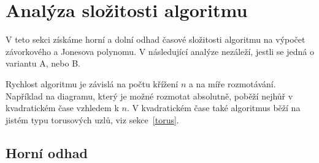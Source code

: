 \section{Analýza složitosti algoritmu}  \label{analyza}
V teto sekci získáme horní a dolní odhad časové složitosti algoritmu na výpočet závorkového a Jonesova polynomu. V následující analýze nezáleží, jestli se jedná o variantu A, nebo B.

Rychlost algoritmu je závislá na počtu křížení $n$ a na míře rozmotávání. Například na diagramu, který je možné rozmotat absolutně, poběží nejhůř v kvadratickém čase vzhledem k $n$. V kvadratickém čase také algoritmus běží na jistém typu torusových uzlů, viz sekce~\ref{torus}.

\subsection{Horní odhad}



